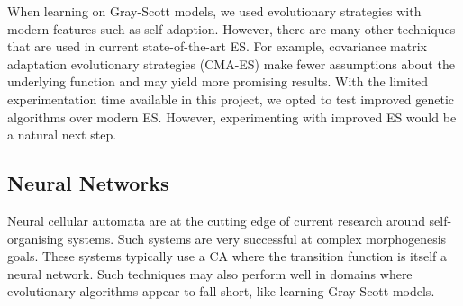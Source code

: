 When learning on Gray-Scott models, we used evolutionary strategies with modern features such as self-adaption. However, there are many other techniques that are used in current state-of-the-art ES. For example, covariance matrix adaptation evolutionary strategies (CMA-ES) make fewer assumptions about the underlying function and may yield more promising results. With the limited experimentation time available in this project, we opted to test improved genetic algorithms over modern ES. However, experimenting with improved ES would be a natural next step.

\subsection{Neural Networks}

Neural cellular automata are at the cutting edge of current research around self-organising systems\cite{mordvintsev2020growing, grattarola2021learning}. Such systems are very successful at complex morphogenesis goals. These systems typically use a CA where the transition function is itself a neural network. Such techniques may also perform well in domains where evolutionary algorithms appear to fall short, like learning Gray-Scott models.
